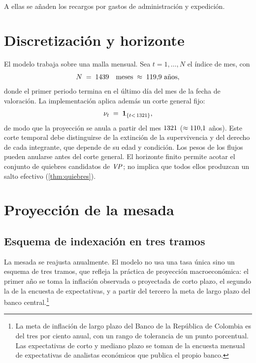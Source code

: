 A ellas se añaden los recargos por gastos de administración y expedición.

\section{Discretización y horizonte}

El modelo trabaja sobre una malla mensual. Sea $t=1,\dots,N$ el índice de mes,
con
\[
  N \;=\; 1439 \quad\text{meses}\;\approx\;119{,}9\ \text{años},
\]
donde el primer periodo termina en el último día del mes de la fecha de
valoración. La implementación aplica además un corte general fijo:
\begin{equation}
\label{eq:vigencia}
  \nu_t \;=\; \mathbf{1}_{\{t<\,1321\}},
\end{equation}
de modo que la proyección se anula a partir del mes $1321$
($\approx110{,}1$ años). Este corte temporal debe distinguirse de la
extinción de la supervivencia y del derecho de cada integrante, que depende
de su edad y condición. Los pesos de los flujos pueden anularse antes del corte
general. El horizonte finito permite acotar el conjunto de quiebres candidatos
de $\mathit{VP}$; no implica que todos ellos produzcan un salto efectivo
(\cref{thm:quiebres}).

\section{Proyección de la mesada}
\label{sec:proyeccion-mesada}

\subsection{Esquema de indexación en tres tramos}

La mesada se reajusta anualmente. El modelo no usa una tasa única sino un esquema
de tres tramos, que refleja la práctica de proyección macroeconómica: el primer
año se toma la inflación observada o proyectada de corto plazo, el segundo la de
la encuesta de expectativas, y a partir del tercero la meta de largo plazo del
banco central.\footnote{La meta de inflación de largo plazo del Banco de la República de Colombia es del tres por ciento anual, con un rango de tolerancia de un punto porcentual. Las expectativas de corto y mediano plazo se toman de la encuesta mensual de expectativas de analistas económicos que publica el propio banco.}

